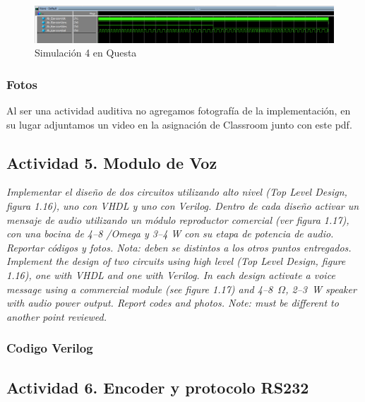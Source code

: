 \begin{figure}
    \centering
    \includegraphics[width=1\linewidth]{imagenes/Sim_4.png}
    \caption{Simulación 4 en Questa}\label{fig:Sim_4}
\end{figure}


\subsubsection*{Fotos}

Al ser una actividad auditiva no agregamos fotografía de la implementación, en su lugar adjuntamos un video en la asignación de Classroom junto con este pdf.

\subsection*{Actividad 5. Modulo de Voz}

\textit{\textcolor{Verde}{Implementar el diseño de dos circuitos utilizando alto nivel (Top Level Design, figura
1.16), uno con VHDL y uno con Verilog. Dentro de cada diseño activar un mensaje de
audio utilizando un módulo reproductor comercial (ver figura 1.17), con una bocina de
4--8 /Omega y 3--4 W con su etapa de potencia de audio. Reportar códigos y fotos. Nota: deben
se distintos a los otros puntos entregados.\\
Implement the design of two circuits using high level (Top Level Design, figure 1.16),
one with VHDL and one with Verilog. In each design activate a voice message using a
commercial module (see figure 1.17) and 4--8~$\Omega$, 2--3~W speaker with audio power output.
Report codes and photos. Note: must be different to another point reviewed.}}


\subsubsection*{Codigo Verilog}






\subsection*{Actividad 6. Encoder y protocolo RS232}

